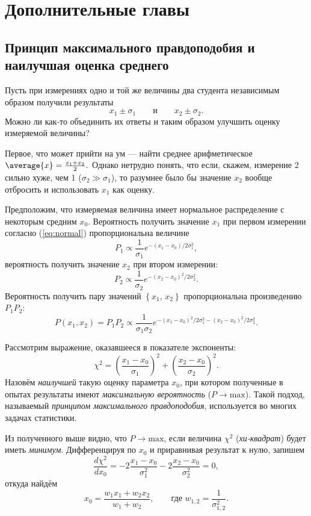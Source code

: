 \chapter{Дополнительные главы}

\small

\section{Принцип максимального правдоподобия и наилучшая оценка среднего}

Пусть при измерениях одно и той же величины два студента
независимым образом получили результаты 
\[
x_{1}\pm\sigma_{1}\qquad\text{и}\qquad x_{2}\pm\sigma_{2}.
\]
Можно ли как-то объединить их ответы и таким образом улучшить оценку
измеряемой величины?

Первое, что может прийти на ум --- найти среднее
арифметическое $\average{x}=\frac{x_{1}+x_{2}}{2}.$ Однако нетрудно
понять, что если, скажем, измерение 2 сильно хуже, чем 1 ($\sigma_{2}\gg\sigma_{1}$),
то разумнее было бы значение $x_{2}$ вообще отбросить и использовать
$x_{1}$ как  оценку.

Предположим, что измеряемая величина имеет нормальное распределение
с некоторым средним $x_{0}$. Вероятность получить значение $x_{1}$
при первом измерении согласно (\ref{eq:normal}) пропорциональна величине
\[
P_{1}\propto\frac{1}{\sigma_{1}}e^{-\left(x_{1}-x_{0}\right)/2\sigma_{1}^{2}},
\]
вероятность получить значение $x_{2}$ при втором измерении:
\[
P_{2}\propto\frac{1}{\sigma_{2}}e^{-\left(x_{2}-x_{0}\right)^{2}/2\sigma_{2}^{2}}.
\]
Вероятность получить пару значений $\left\{ x_{1},\,x_{2}\right\} $
пропорциональна произведению $P_{1}P_{2}$:
\[
P\left(x_{1},x_{2}\right)=P_{1}P_{2}\propto\frac{1}{\sigma_{1}\sigma_{2}}e^{-\left(x_{1}-x_{0}\right)^{2}/2\sigma_{1}^{2}-\left(x_{2}-x_{0}\right)^{2}/2\sigma_{2}^{2}}.
\]

Рассмотрим выражение, оказавшееся в показателе экспоненты:
\[
\chi^{2}=\left(\frac{x_{1}-x_{0}}{\sigma_{1}}\right)^{2}+\left(\frac{x_{2}-x_{0}}{\sigma_{2}}\right)^{2}.
\]
Назовём \emph{наилучшей} такую оценку параметра
$x_{0}$, при котором полученные в опытах результаты имеют \emph{максимальную
вероятность} ($P\to\mathrm{max}$). Такой подход, называемый
\emph{принципом максимального правдоподобия}, используется
во многих задачах статистики.

Из полученного выше видно, что $P\to\mathrm{max}$, если
величина $\chi^{2}$ (\emph{хи-квадрат}) будет иметь
\emph{минимум}. Дифференцируя по $x_{0}$ и приравнивая
результат к нулю, запишем 
\[
\frac{d\chi^{2}}{dx_{0}}=-2\frac{x_{1}-x_{0}}{\sigma_{1}^{2}}-2\frac{x_{2}-x_{0}}{\sigma_{2}^{2}}=0,
\]
откуда найдём
\begin{equation}
x_{0}=\frac{w_{1}x_{1}+w_{2}x_{2}}{w_{1}+w_{2}},\qquad\text{где }w_{1,2}=\frac{1}{\sigma_{1,2}^{2}}.
\end{equation}

